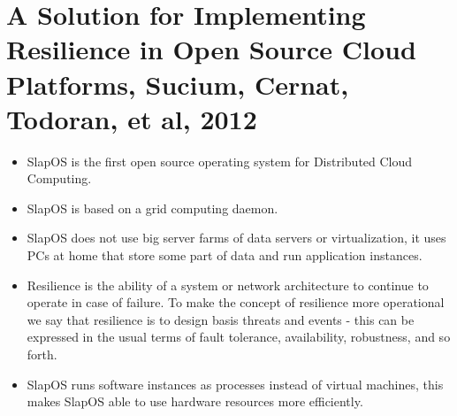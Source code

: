 \section{A Solution for Implementing Resilience in Open Source Cloud Platforms, Sucium, Cernat, Todoran, et al, 2012}

\begin{itemize}
  \item SlapOS is the first open source operating system for Distributed Cloud Computing.
  \item SlapOS is based on a grid computing daemon.
  \item SlapOS does not use big server farms of data servers or virtualization, it uses PCs at home that store some part of data and run application instances.
  \item Resilience is the ability of a system or network architecture to continue to operate in case of failure. To make the concept of resilience more operational we say that resilience is to design basis threats and events - this can be expressed in the usual terms of fault tolerance, availability, robustness, and so forth.
  \item SlapOS runs software instances as processes instead of virtual machines, this makes SlapOS able to use hardware resources more efficiently.
\end{itemize}
